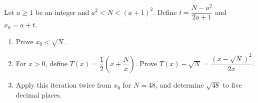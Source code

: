 Let $a\ge1$ be an integer and $a^2<N<(a+1)^2$. Define $t=\dfrac{N-a^2}{2a+1}$ and $x_0=a+t$.
\begin{enumerate}
\item Prove $x_0<\sqrt N$.
\item For $x>0$, define $T(x)=\dfrac{1}{2}\left(x+\dfrac{N}{x}\right)$. Prove $T(x)-\sqrt N=\dfrac{(x-\sqrt N)^2}{2x}$.
\item Apply this iteration twice from $x_0$ for $N=48$, and determine $\sqrt{48}$ to five decimal places.
\end{enumerate}
